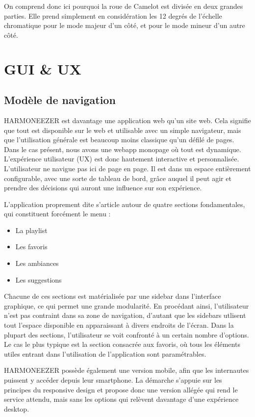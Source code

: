 \documentclass[a4paper,12pt]{article}
\begin{document}
On comprend donc ici pourquoi la roue de Camelot est divisée en deux grandes parties. Elle prend simplement en considération les 12 degrés de l'échelle chromatique pour le mode majeur d'un côté, et pour le mode mineur d'un autre côté.

\newpage

\section{GUI \& UX}

\subsection{Modèle de navigation}

HARMONEEZER est davantage une application web qu'un site web. Cela signifie que tout est disponible sur le web et utilisable avec un simple navigateur, mais que l'utilisation générale est beaucoup moins classique qu'un défilé de pages. Dans le cas présent, nous avons une webapp monopage où tout est dynamique. L'expérience utilisateur (UX) est donc hautement interactive et personnalisée. L'utilisateur ne navigue pas ici de page en page. Il est dans un espace entièrement configurable, avec une sorte de tableau de bord, grâce auquel il peut agir et prendre des décisions qui auront une influence sur son expérience.

L'application proprement dite s'article autour de quatre sections fondamentales, qui constituent forcément le menu :

\begin{itemize}
 \item{La playlist}
 \item{Les favoris}
 \item{Les ambiances}
 \item{Les suggestions}
\end{itemize}

Chacune de ces sections est matérialisée par une sidebar dans l'interface graphique, ce qui permet une grande modularité. En procédant ainsi, l'utilisateur n'est pas contraint dans sa zone de navigation, d'autant que les sidebars utlisent tout l'espace disponible en apparaissant à divers endroits de l'écran. Dans la plupart des sections, l'utilisateur se voit confronté à un certain nombre d'options. Le cas le plus typique est la section consacrée aux favoris, où tous les éléments utiles entrant dans l'utilisation de l'application sont paramétrables.

HARMONEEZER possède également une version mobile, afin que les internautes puissent y accéder depuis leur smartphone. La démarche s'appuie sur les principes du responsive design et propose donc une version allégée qui rend le service attendu, mais sans les options qui relèvent davantage d'une expérience desktop.
\end{document}
